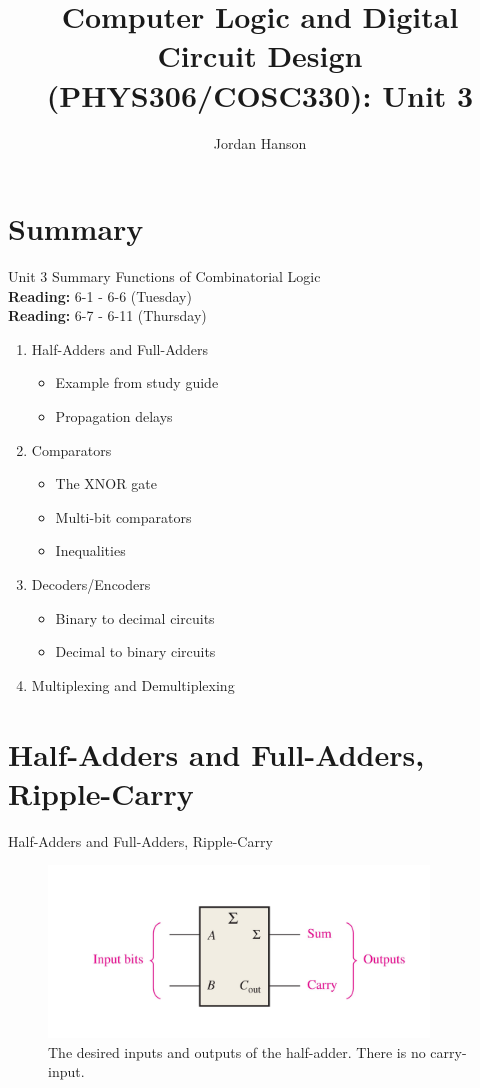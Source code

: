 \documentclass{beamer}
\title{Computer Logic and Digital Circuit Design (PHYS306/COSC330): Unit 3}
\author{Jordan Hanson}
\institute{Whittier College Department of Physics and Astronomy}
\begin{document}
\maketitle

\section{Summary}

\begin{frame}{Unit 3 Summary}
\alert{Functions of Combinatorial Logic} \\
\textbf{Reading:} 6-1 - 6-6 (Tuesday) \\
\textbf{Reading:} 6-7 - 6-11 (Thursday)
\begin{enumerate}
\item Half-Adders and Full-Adders
\begin{itemize}
\item Example from study guide
\item Propagation delays
\end{itemize}
\item Comparators
\begin{itemize}
\item The XNOR gate
\item Multi-bit comparators
\item Inequalities
\end{itemize}
\item Decoders/Encoders
\begin{itemize}
\item Binary to decimal circuits
\item Decimal to binary circuits
\end{itemize}
\item Multiplexing and Demultiplexing
\end{enumerate}
\end{frame}

\section{Half-Adders and Full-Adders, Ripple-Carry}

\begin{frame}{Half-Adders and Full-Adders, Ripple-Carry}
\begin{figure}
\centering
\includegraphics[width=0.9\textwidth]{figures/adder1.pdf}
\caption{\label{fig:add1} The desired inputs and outputs of the half-adder.  There is no carry-input.}
\end{figure}
\end{frame}
\end{document}
